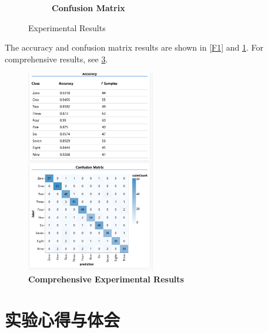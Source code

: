 \begin{sduDocument}
\begin{figure}[H]
\begin{subfigure}{0.45\textwidth}
            \caption{\bf Confusion Matrix}  %
            \label{F2}  %
        \end{subfigure}
        \caption{Experimental Results}  %
        \label{fig:results}  %
    \end{figure}

    The accuracy and confusion matrix results are shown in \cref{F1} and \cref{F2}. For comprehensive results, see \cref{fig:results2}.

    \begin{figure}[H]  %
        \centering  %
        \includegraphics[width=0.5\textwidth]{Figures/F3.png}  %
        \caption{\bf Comprehensive Experimental Results}  %
        \label{fig:results2}  %
    \end{figure}

    \section{实验心得与体会}  %
\end{sduDocument}  %